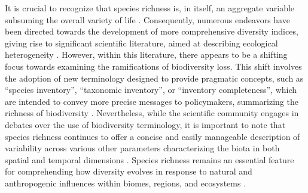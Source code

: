 \documentclass[12pt,authoryear]{elsarticle}
\begin{document}
It is crucial to recognize that species richness is, in itself, an aggregate variable subsuming the overall variety of life \citep{Marquet2004}. Consequently, numerous endeavors have been directed towards the development of more comprehensive diversity indices, giving rise to significant scientific literature, aimed at describing ecological heterogeneity \citep{tuomisto_commentary_2011, moreno_commentary_2011, daly_ecological_2018}. However, within this literature, there appears to be a shifting focus towards examining the ramifications of biodiversity loss. This shift involves the adoption of new terminology designed to provide pragmatic concepts, such as ``species inventory'', ``taxonomic inventory'', or ``inventory completeness'', which are intended to convey more precise messages to policymakers, summarizing the richness of biodiversity \citep{pereira_essential_2013, butchart_global_2010}. Nevertheless, while the scientific community engages in debates over the use of biodiversity terminology, it is important to note that species richness continues to offer a concise and easily manageable description of variability across various other parameters characterizing the biota in both spatial and temporal dimensions \citep{APPELTANS2012}. Species richness remains an essential feature for comprehending how diversity evolves in response to natural and anthropogenic influences within biomes, regions, and ecosystems \citep{troia2017, magurran2011}.

\end{document}
